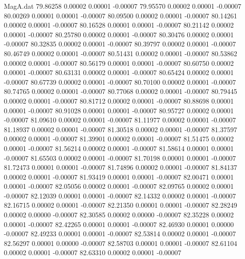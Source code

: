 \begin{filecontents}{MagA.dat}
  79.86258    0.00002    0.00001   -0.00007
  79.95570    0.00002    0.00001   -0.00007
  80.00269    0.00001    0.00001   -0.00007
  80.09500    0.00002    0.00001   -0.00007
  80.14261    0.00002    0.00001   -0.00007
  80.16528    0.00001    0.00001   -0.00007
  80.21142    0.00002    0.00001   -0.00007
  80.25780    0.00002    0.00001   -0.00007
  80.30476    0.00002    0.00001   -0.00007
  80.32835    0.00002    0.00001   -0.00007
  80.39797    0.00002    0.00001   -0.00007
  80.46749    0.00002    0.00001   -0.00007
  80.51431    0.00002    0.00001   -0.00007
  80.53862    0.00002    0.00001   -0.00007
  80.56179    0.00001    0.00001   -0.00007
  80.60750    0.00002    0.00001   -0.00007
  80.63131    0.00002    0.00001   -0.00007
  80.65424    0.00002    0.00001   -0.00007
  80.67739    0.00002    0.00001   -0.00007
  80.70100    0.00002    0.00001   -0.00007
  80.74765    0.00002    0.00001   -0.00007
  80.77068    0.00002    0.00001   -0.00007
  80.79445    0.00002    0.00001   -0.00007
  80.81712    0.00002    0.00001   -0.00007
  80.88698    0.00001    0.00001   -0.00007
  80.91028    0.00001    0.00001   -0.00007
  80.95727    0.00002    0.00001   -0.00007
  81.09610    0.00002    0.00001   -0.00007
  81.11977    0.00002    0.00001   -0.00007
  81.18937    0.00002    0.00001   -0.00007
  81.30518    0.00002    0.00001   -0.00007
  81.37597    0.00002    0.00001   -0.00007
  81.39901    0.00002    0.00001   -0.00007
  81.51475    0.00002    0.00001   -0.00007
  81.56214    0.00002    0.00001   -0.00007
  81.58614    0.00001    0.00001   -0.00007
  81.65503    0.00002    0.00001   -0.00007
  81.70198    0.00001    0.00001   -0.00007
  81.72473    0.00001    0.00001   -0.00007
  81.74896    0.00002    0.00001   -0.00007
  81.84137    0.00002    0.00001   -0.00007
  81.93419    0.00001    0.00001   -0.00007
  82.00471    0.00001    0.00001   -0.00007
  82.05056    0.00002    0.00001   -0.00007
  82.09765    0.00002    0.00001   -0.00007
  82.12039    0.00001    0.00001   -0.00007
  82.14332    0.00002    0.00001   -0.00007
  82.16715    0.00002    0.00001   -0.00007
  82.21350    0.00001    0.00001   -0.00007
  82.28249    0.00002    0.00000   -0.00007
  82.30585    0.00002    0.00000   -0.00007
  82.35228    0.00002    0.00001   -0.00007
  82.42265    0.00001    0.00001   -0.00007
  82.46930    0.00001    0.00000   -0.00007
  82.49233    0.00001    0.00001   -0.00007
  82.53814    0.00002    0.00001   -0.00007
  82.56297    0.00001    0.00000   -0.00007
  82.58703    0.00001    0.00001   -0.00007
  82.61104    0.00002    0.00001   -0.00007
  82.63310    0.00002    0.00001   -0.00007

\end{filecontents}
